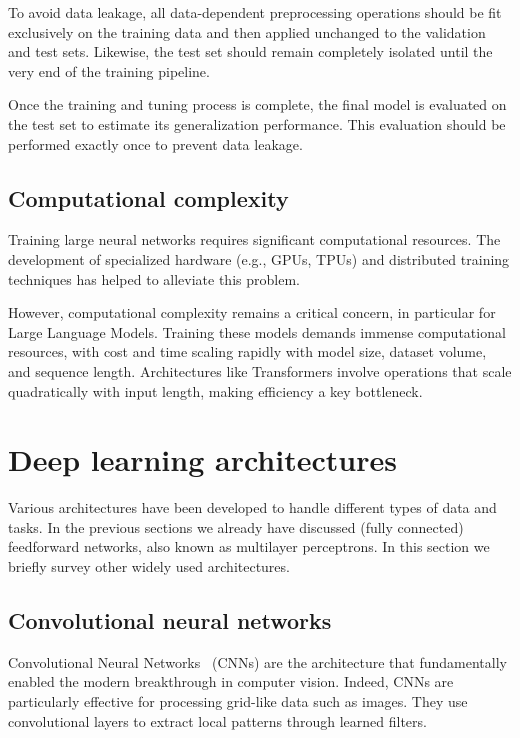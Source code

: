 To avoid data leakage, all data-dependent preprocessing operations should be fit exclusively on the training data and then applied unchanged to the validation and test sets. Likewise, the test set should remain completely isolated until the very end of the training pipeline.

Once the training and tuning process is complete, the final model is evaluated on the test set to estimate its generalization performance. This evaluation should be performed exactly once to prevent data leakage.




\subsection{Computational complexity} 
Training large neural networks requires significant computational resources. The development of specialized hardware (e.g., GPUs, TPUs) and distributed training techniques has helped to alleviate this problem. 

However, computational complexity remains a critical concern, in particular for Large Language Models. Training these models demands immense computational resources, with cost and time scaling rapidly with model size, dataset volume, and sequence length. Architectures like Transformers involve operations that scale quadratically with input length, making efficiency a key bottleneck. 









\section{Deep learning architectures}

Various architectures have been developed to handle different types of data and tasks. In the previous sections we already have discussed  (fully connected) feedforward networks, also known as multilayer perceptrons. In this section we briefly survey  other widely used architectures.





\subsection{Convolutional neural networks}


Convolutional Neural Networks~\cite{fukushima1980neocognitron,lecun2002gradient} (CNNs) are the architecture that fundamentally enabled the modern breakthrough in computer vision. Indeed,
CNNs are particularly effective for processing grid-like data such as images. They use convolutional layers to extract local patterns through learned filters. 

